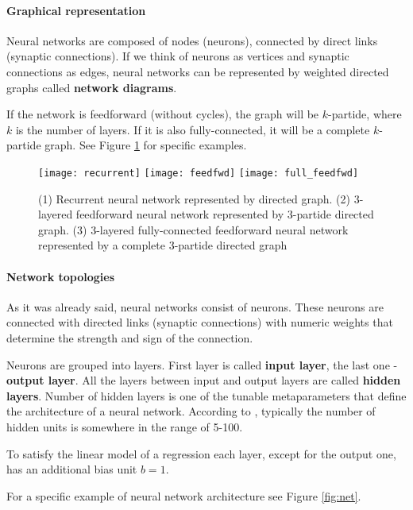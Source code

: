 \paragraph{Graphical representation} Neural networks are composed of nodes (neurons), connected by direct links (synaptic connections). If we think of neurons as vertices and synaptic connections as edges, neural networks can be represented by weighted directed graphs called \textbf{network diagrams}.

If the network is feedforward (without cycles), the graph will be $ k $-partide, where $ k $ is the number of layers. If it is also fully-connected, it will be a complete $ k $-partide graph. See Figure \ref{fig:graphs} for specific examples.

\begin{figure}[H]
  \centering
  \texttt{[image: recurrent]}
  \texttt{[image: feedfwd]}
  \texttt{[image: full\_feedfwd]}
  \caption{(1) Recurrent neural network represented by directed graph. (2) 3-layered feedforward neural network represented by 3-partide directed graph. (3) 3-layered fully-connected feedforward neural network represented by a complete 3-partide directed graph}
  \label{fig:graphs}
\end{figure}

\paragraph{Network topologies}
As it was already said, neural networks consist of neurons. These neurons are connected with directed links (synaptic connections) with numeric weights that determine the strength and sign of the connection.

Neurons are grouped into layers. First layer is called \textbf{input layer}, the last one - \textbf{output layer}. All the layers between input and output layers are called \textbf{hidden layers}. Number of hidden layers is one of the tunable metaparameters that define the architecture of a neural network. According to \cite{Hastie-et-al-2013}, typically the number of hidden units is somewhere in the range of 5-100.

To satisfy the linear model of a regression each layer, except for the output one, has an additional bias unit $ b = 1 $.

For a specific example of neural network architecture see Figure \ref{fig:net}.

